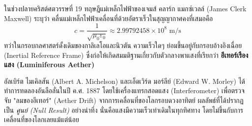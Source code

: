ในช่วงปลายคริสต์ศตวรรษที่ 19 ทฤษฎีแม่เหล็กไฟฟ้าของเจมส์ คลาร์ก แมกซ์เวลล์ (James Clerk Maxwell) ระบุว่า คลื่นแม่เหล็กไฟฟ้าเคลื่อนที่ด้วยอัตราเร็วในสุญญากาศคงที่เสมอคือ
\begin{equation}
c = \frac{1}{\sqrt{\mu_0 \varepsilon_0}} \approx 2.99792458 \times 10^8 \text{ m/s}
\end{equation}
ทว่าในกรอบกลศาสตร์ดั้งเดิมของกาลิเลโอและนิวตัน ความเร็วใดๆ ย่อมขึ้นอยู่กับกรอบอ้างอิงเฉื่อย (Inertial Reference Frame) ซึ่งก่อให้เกิดสมมติฐานเกี่ยวกับตัวกลางพาแสงที่เรียกว่า \textbf{อีเทอร์เรืองแสง (Luminiferous Aether)}

อัลเบิร์ต ไมเคิลสัน (Albert A. Michelson) และเอ็ดเวิร์ด มอร์ลีย์ (Edward W. Morley) ได้ทำการทดลองอันลือลั่นในปี ค.ศ. 1887 โดยใช้เครื่องแทรกสอดแสง (Interferometer) เพื่อตรวจจับ "ลมของอีเทอร์" (Aether Drift) จากการเคลื่อนที่ของโลกรอบดวงอาทิตย์ ผลลัพธ์ที่ได้ปรากฏเป็น \textit{ศูนย์ (Null Result)} อย่างน่าทึ่ง นั่นคือแสงมีความเร็วเท่าเดิมในทุกทิศทาง โดยไม่ขึ้นกับการเคลื่อนที่ของโลกเลยแม้แต่น้อย

